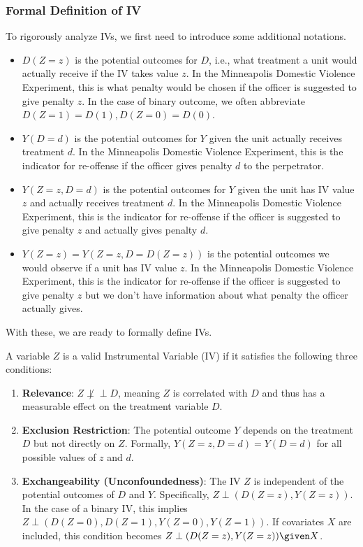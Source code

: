 \subsubsection{Formal Definition of IV}
To rigorously analyze IVs, we first need to introduce some additional notations. 
\begin{itemize}
    \item \(D(Z = z)\) is the potential outcomes for \(D\), i.e., what treatment a unit would actually receive if the IV takes value $z$. In the Minneapolis Domestic Violence Experiment, this is what penalty would be chosen if the officer is suggested to give penalty \(z\). In the case of binary outcome, we often abbreviate \(D(Z = 1) = D(1), D(Z = 0) = D(0)\).
    \item \(Y(D = d)\) is the potential outcomes for \(Y\) given the unit actually receives treatment \(d\). In the Minneapolis Domestic Violence Experiment, this is the indicator for re-offense if the officer gives penalty \(d\) to the perpetrator. 
    \item \(Y(Z = z, D = d)\) is the potential outcomes for \(Y\) given the unit has IV value \(z\) and actually receives treatment \(d\). In the Minneapolis Domestic Violence Experiment, this is the indicator for re-offense if the officer is suggested to give penalty \(z\) and actually gives penalty \(d\). 
    \item \(Y(Z = z) = Y(Z = z, D = D(Z = z))\) is the potential outcomes we would observe if a unit has IV value $z$. In the Minneapolis Domestic Violence Experiment, this is the indicator for re-offense if the officer is suggested to give penalty \(z\) but we don't have information about what penalty the officer actually gives. 
\end{itemize}
With these, we are ready to formally define IVs. 
\begin{definition}
    A variable \(Z\) is a valid Instrumental Variable (IV) if it satisfies the following three conditions:  
    \begin{enumerate}
        \item \textbf{Relevance}: \(Z \not \perp\!\!\!\perp D\), meaning \(Z\) is correlated with \(D\) and thus has a measurable effect on the treatment variable \(D\).  
        \item \textbf{Exclusion Restriction}: The potential outcome \(Y\) depends on the treatment \(D\) but not directly on \(Z\). Formally, \(Y(Z = z, D = d) = Y(D = d)\) for all possible values of \(z\) and \(d\).  
        \item \textbf{Exchangeability (Unconfoundedness)}: The IV \(Z\) is independent of the potential outcomes of \(D\) and \(Y\). Specifically, \(Z \perp (D(Z = z), Y(Z = z))\). In the case of a binary IV, this implies \(Z \perp (D(Z = 0), D(Z = 1), Y(Z = 0), Y(Z = 1))\). If covariates \(X\) are included, this condition becomes \(Z \perp (D(Z = z), Y(Z = z)) \given X\).  
    \end{enumerate}
\end{definition}

